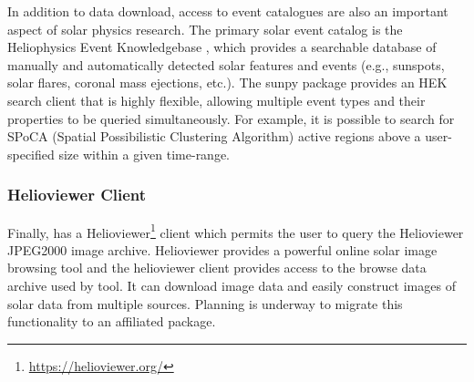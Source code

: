 In addition to data download, access to event catalogues are also an important aspect of solar physics research.
The primary solar event catalog is the Heliophysics Event Knowledgebase \citep[HEK,][]{hek}, which provides a searchable database of manually and automatically detected solar features and events (e.g., sunspots, solar flares, coronal mass ejections, etc.). The sunpy package provides an HEK search client that is highly flexible, allowing multiple event types and their properties to be queried simultaneously.
For example, it is possible to search for SPoCA (Spatial Possibilistic Clustering Algorithm) \citep{2014AA...561A..29V} active regions above a user-specified size within a given time-range.

\subsubsection{Helioviewer Client}
\label{sec:helioviewer}

Finally,  has a Helioviewer\footnote{\url{https://helioviewer.org/}} client which permits the user to query the Helioviewer JPEG2000 image archive.
Helioviewer provides a powerful online solar image browsing tool and the helioviewer client provides access to the browse data archive used by tool.
It can download image data and easily construct images of solar data from multiple sources.
Planning is underway to migrate this functionality to an affiliated package.
